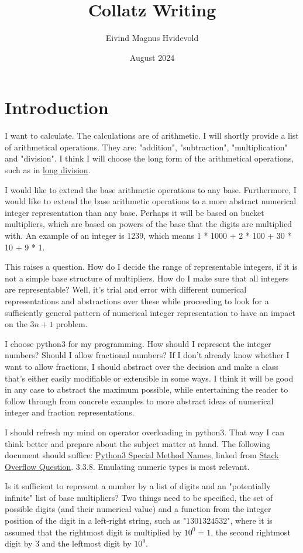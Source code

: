 \documentclass{article}
\title{Collatz Writing}
\author{Eivind Magnus Hvidevold}
\date{August 2024}
\begin{document}
\maketitle

\section{Introduction}

I want to calculate. The calculations are of arithmetic. I will shortly provide a list of arithmetical operations.
They are: "addition", "subtraction", "multiplication" and "division". I think I will choose the long form of the arithmetical operations, such as in \href{https://en.wikipedia.org/wiki/Long_division}{long division}.

I would like to extend the base arithmetic operations to any base. Furthermore, I would like to extend the base arithmetic operations to a more abstract numerical integer representation than any base. Perhaps it will be based on bucket multipliers, which are based on powers of the base that the digits are multiplied with.  An example of an integer is 1239, which means 1 * 1000 + 2 * 100 + 30 * 10 + 9 * 1.

This raises a question. How do I decide the range of representable integers, if it is not a simple base structure of multipliers. How do I make sure that all integers are representable? Well, it's trial and error with different numerical representations and abstractions over these while proceeding to look for a sufficiently general pattern of numerical integer representation to have an impact on the $3n + 1$ problem.

I choose python3 for my programming. How should I represent the integer numbers? Should I allow fractional numbers? If I don't already know whether I want to allow fractions, I should abstract over the decision and make a class that's either easily modifiable or extensible in some ways. I think it will be good in any case to abstract the maximum possible, while entertaining the reader to follow through from concrete examples to more abstract ideas of numerical integer and fraction representations.

I should refresh my mind on operator overloading in python3. That way I can think better and prepare about the subject matter at hand. The following document should suffice: \href{https://docs.python.org/3/reference/datamodel.html#special-method-names}{Python3 Special Method Names},
linked from \href{https://stackoverflow.com/questions/2400635/comprehensive-guide-to-operator-overloading-in-python}{Stack Overflow Question}. 3.3.8. Emulating numeric types is most relevant.

Is it sufficient to represent a number by a list of digits and an "potentially infinite" list of base multipliers? Two things need to be specified, the set of possible digits (and their numerical value) and a function from the integer position of the digit in a left-right string, such as "$1301324532$", where it is assumed that the rightmost digit is multiplied by $10^0 = 1$, the second rightmost digit by $3$ and the leftmost digit by $10^9$.
\end{document}
